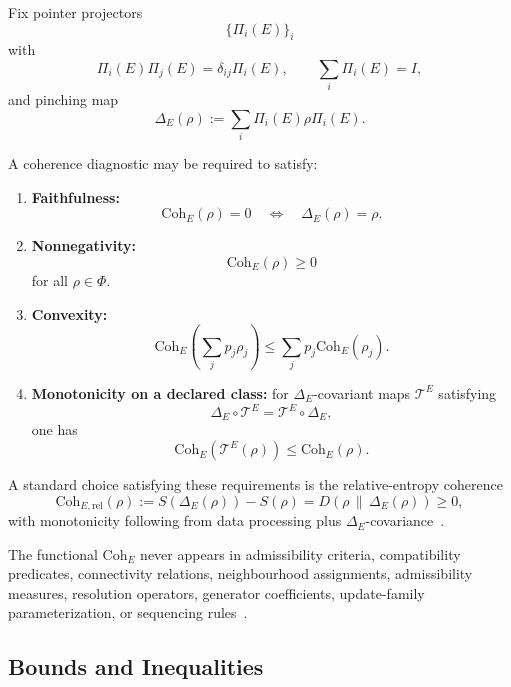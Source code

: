 \documentclass[aps,prx,onecolumn,11pt]{revtex4-2}
\theoremstyle{plain}
\theoremstyle{definition}
\theoremstyle{remark}
\begin{document}
Fix pointer projectors
\[
\{\Pi_i(E)\}_i
\]
with
\[
\Pi_i(E)\Pi_j(E)=\delta_{ij}\Pi_i(E),
\qquad
\sum_i\Pi_i(E)=I,
\]
and pinching map
\[
\Delta_E(\rho)
:=
\sum_i\Pi_i(E)\rho\Pi_i(E).
\]

A coherence diagnostic may be required to satisfy:

\begin{enumerate}[label=(C\arabic*), leftmargin=2.5em]

\item \textbf{Faithfulness:}
\[
\mathrm{Coh}_E(\rho)=0
\quad\Longleftrightarrow\quad
\Delta_E(\rho)=\rho.
\]

\item \textbf{Nonnegativity:}
\[
\mathrm{Coh}_E(\rho)\geq 0
\]
for all \(\rho\in\Phi\).

\item \textbf{Convexity:}
\[
\mathrm{Coh}_E\!\left(\sum_j p_j\rho_j\right)
\leq
\sum_j p_j\mathrm{Coh}_E(\rho_j).
\]

\item \textbf{Monotonicity on a declared class:}
for \(\Delta_E\)-covariant maps \(\mathcal{T}^E\) satisfying
\[
\Delta_E\circ\mathcal{T}^E
=
\mathcal{T}^E\circ\Delta_E,
\]
one has
\begin{equation}
\mathrm{Coh}_E(\mathcal{T}^E(\rho))
\leq
\mathrm{Coh}_E(\rho).
\label{eq:coh_monotone_class}
\end{equation}

\end{enumerate}

A standard choice satisfying these requirements is the relative-entropy
coherence
\begin{equation}
\mathrm{Coh}_{E,\mathrm{rel}}(\rho)
:=
S(\Delta_E(\rho))-S(\rho)
=
D\!\left(\rho\,\|\,\Delta_E(\rho)\right)
\geq 0,
\label{eq:relative_entropy_coherence}
\end{equation}
with monotonicity following from data processing plus
\(\Delta_E\)-covariance~\cite{Petz1986,Baumgratz2014,ChitambarGour2019,Wilde2017}.

The functional \(\mathrm{Coh}_E\) never appears in admissibility
criteria, compatibility predicates, connectivity relations,
neighbourhood assignments, admissibility measures, resolution
operators, generator coefficients, update-family parameterization, or
sequencing rules~\cite{Gisin1989,Gisin1990,Polchinski1991,Watrous2018}.

\subsection{Bounds and Inequalities}
\label{subsec:coherence_bounds}
\end{document}
